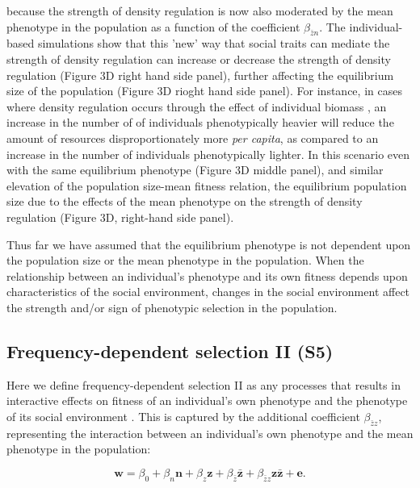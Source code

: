 \documentclass{article}
\begin{document}
\noindent because the strength of density regulation is now also moderated by the mean phenotype in the population as a function of the coefficient  $\beta_{\bar{z}n}$. The individual-based simulations show that this 'new' way that social traits can mediate the strength of density regulation can increase or decrease the strength of density regulation (Figure 3D right hand side panel), further affecting the equilibrium size of the population (Figure 3D rioght hand side panel). For instance, in cases where density regulation occurs through the effect of individual biomass \citep{Owen-Smith2002}, an increase in the number of of individuals phenotypically heavier will reduce the amount of resources disproportionately more \textit{per capita}, as compared to an increase in the number of individuals phenotypically lighter. In this scenario even with the same equilibrium phenotype (Figure 3D middle panel), and similar elevation of the population size-mean fitness relation, the equilibrium population size due to the effects of the mean phenotype on the strength of density regulation (Figure 3D, right-hand side panel). 

Thus far we have assumed that the equilibrium phenotype is not dependent upon the population size or the mean phenotype in the population. When the relationship between an individual's phenotype and its own fitness depends upon characteristics of the social environment, changes in the social environment affect the strength and/or sign of phenotypic selection in the population. 
 
 
\subsection{Frequency-dependent selection II (S5)}

 Here we define frequency-dependent selection II as any processes that results in interactive effects on fitness of an individual's own phenotype and the phenotype of its social environment \citep{Araya-Ajoy2020}. This is captured by the additional coefficient $\beta_{\bar{z}z}$, representing the interaction between an individual's own phenotype and the mean phenotype in the population:  

\begin{equation} \label{eq: FDS}
\mathbf{w}=\beta_{0} +\beta_{n} \mathbf{n} + \beta_{z} \mathbf{z}+ \beta_{\bar{z}} \mathbf{\bar{z}}  + \beta_{\bar{z}z} \mathbf{z\bar{z}}  +  \mathbf{e}.
\end{equation}
\end{document}
